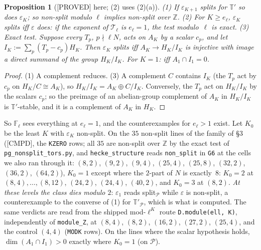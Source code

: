 \documentclass[11pt]{article}
\newcommand{\Z}{\mathbb{Z}}
\newcommand{\F}{\mathbb{F}}
\newcommand{\code}[1]{\texttt{#1}}
\newcommand{\file}[1]{\texttt{#1}}
\newcommand{\PROVED}{\textsf{\small[PROVED]}}
\newcommand{\CMPD}{\textsf{\small[CMPD]}}
\newtheorem*{proposition*}{Proposition}
\begin{document}
\begin{proposition*}[\PROVED{} here; (2) uses {}(2)(a)]
\textup{(1)} If $\varepsilon_{K+1}$ splits for $\mathbb T'$ so does $\varepsilon_K$; so non-split modulo $\ell$ implies non-split over $\Z$. \textup{(2)} For $K\ge e_\ell$, $\varepsilon_K$ splits iff $\varepsilon$ does: if the exponent of $\mathcal T_\ell$ is $e_\ell=1$, the test modulo~$\ell$ is exact. \textup{(3) Exact test.} Suppose every $T_p$, $p\nmid\ell N$, acts on $A_K$ by a scalar $c_p$, and let $I_K:=\sum_p(T_p-c_p)H_K$. Then $\varepsilon_K$ splits iff $A_K\to H_K/I_K$ is injective with image a direct summand of the group $H_K/I_K$. For $K=1$: iff $A_1\cap I_1=0$.
\end{proposition*}
\begin{proof} (1) A complement reduces. (3) A complement $C$ contains $I_K$ (the $T_p$ act by $c_p$ on $H_K/C\cong A_K$), so $H_K/I_K=A_K\oplus C/I_K$. Conversely, the $T_p$ act on $H_K/I_K$ by the scalars $c_p$; so the preimage of an abelian-group complement of $A_K$ in $H_K/I_K$ is $\mathbb T'$-stable, and it is a complement of $A_K$ in $H_K$.\end{proof}

So $\F_\ell$ sees everything at $e_\ell=1$, and the counterexamples for $e_\ell>1$ exist. Let $K_0$ be the least $K$ with $\varepsilon_K$ non-split. On the $35$ non-split lines of the family of \S3 (\CMPD, the \code{KZERO} rows; all $35$ are non-split over $\Z$ by the exact test of \file{pg\_nonsplit\_tors.py}, and \code{hecke\_structure} reads \code{non\_split} in \code{G6} at the cells we also ran through it: $(8,2)$, $(9,2)$, $(9,4)$, $(25,4)$, $(25,8)$, $(32,2)$, $(36,2)$, $(64,2)$), $K_0=1$ except where the $2$-part of $N$ is exactly~$8$: $K_0=2$ at $(8,4),\dots,(8,12)$, $(24,2)$, $(24,4)$, $(40,2)$, and $K_0=3$ at $(8,2)$. \emph{At these levels the class dies modulo $2$}: $\varepsilon_1$ reads split$_{\mathcal P}$ while $\varepsilon$ is non-split, a counterexample to the converse of (1) for $\mathbb T'_{\mathcal P}$, which is what is computed. The same verdicts are read from the shipped mod-$\ell^{K}$ route \code{D.module(ell, K)}, independently of \code{module\_Z}, at $(8,4)$, $(8,2)$, $(16,2)$, $(27,2)$, $(25,4)$, and the control $(4,4)$ (\code{MODK} rows). On the lines where the scalar hypothesis holds, $\dim(A_1\cap I_1)>0$ exactly where $K_0=1$ (on $\mathcal P$).
\end{document}
